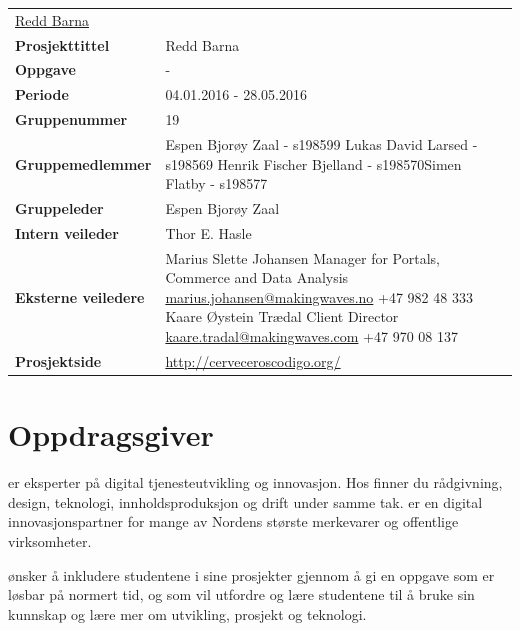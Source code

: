 \begin{flushleft}
\begin{tabular}[ht]{@{}lp{100mm}@{}}
\href{http://www.reddbarna.no/}{Redd Barna} \\
\textbf{Prosjekttittel} & Redd Barna \\ 
\textbf{Oppgave} & - \\ 
\textbf{Periode} & 04.01.2016 - 28.05.2016 \\ 
\textbf{Gruppenummer} & 19 \\ 
\textbf{Gruppemedlemmer} & Espen Bjorøy Zaal - s198599 \newline Lukas David Larsed - s198569 \newline Henrik Fischer Bjelland - s198570\newline Simen Flatby - s198577 \\ 
\textbf{Gruppeleder} & Espen Bjorøy Zaal \\ 
\textbf{Intern veileder} & Thor E. Hasle \\ 
\textbf{Eksterne veiledere} & Marius Slette Johansen \newline Manager for Portals, Commerce and Data Analysis \newline \href{mailto:marius.johansen@makingwaves.no}{marius.johansen@makingwaves.no} \newline +47 982 48 333 \newline \newline Kaare Øystein Trædal \newline Client Director \newline \href{mailto:kaare.tradal@makingwaves.com}{kaare.tradal@makingwaves.com} \newline +47 970 08 137 \\
\textbf{Prosjektside} & \url{http://cerveceroscodigo.org/} \\
\end{tabular} 
\end{flushleft}

\pagebreak
\section{Oppdragsgiver}
\mw{} er eksperter på digital tjenesteutvikling og innovasjon. Hos \mw{} finner du rådgivning, design, teknologi, innholdsproduksjon og drift under samme tak. \mw{} er en digital innovasjonspartner for mange av Nordens største merkevarer og offentlige virksomheter.

\mw{} ønsker å inkludere studentene i sine prosjekter gjennom å gi en oppgave som er løsbar på normert tid, og som vil utfordre og lære studentene til å bruke sin kunnskap og lære mer om utvikling, prosjekt og teknologi.


